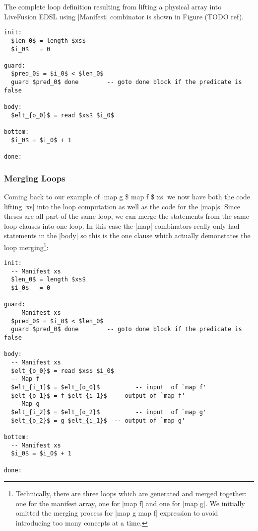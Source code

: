 The complete loop definition resulting from lifting a physical array into LiveFusion EDSL using |Manifest| combinator is shown in Figure (TODO ref).

\begin{lstlisting}[mathescape]
init:
  $len_0$ = length $xs$
  $i_0$   = 0

guard:
  $pred_0$ = $i_0$ < $len_0$
  guard $pred_0$ done        -- goto done block if the predicate is false

body:
  $elt_{o_0}$ = read $xs$ $i_0$

bottom:
  $i_0$ = $i_0$ + 1

done:

\end{lstlisting}


\subsubsection{Merging Loops}

Coming back to our example of |map g \$ map f \$ xs| we now have both the code lifting |xs| into the loop computation as well as the code for the |map|s. Since theses are all part of the same loop, we can merge the statements from the same loop clauses into one loop. In this case the |map| combinators really only had statements in the |body| so this is the one clause which actually demonstates the loop merging\footnote{Technically, there are three loops which are generated and merged together: one for the manifest array, one for |map f| and one for |map g|. We initially omitted the merging process for |map g \compose map f| expression to avoid introducing too many concepts at a time.}:

\begin{lstlisting}[mathescape]
init:
  -- Manifest xs
  $len_0$ = length $xs$
  $i_0$   = 0

guard:
  -- Manifest xs
  $pred_0$ = $i_0$ < $len_0$
  guard $pred_0$ done        -- goto done block if the predicate is false

body:
  -- Manifest xs
  $elt_{o_0}$ = read $xs$ $i_0$
  -- Map f
  $elt_{i_1}$ = $elt_{o_0}$          -- input  of `map f'
  $elt_{o_1}$ = f $elt_{i_1}$  -- output of `map f'
  -- Map g
  $elt_{i_2}$ = $elt_{o_2}$          -- input  of `map g'
  $elt_{o_2}$ = g $elt_{i_1}$  -- output of `map g'

bottom:
  -- Manifest xs
  $i_0$ = $i_0$ + 1

done:

\end{lstlisting}




